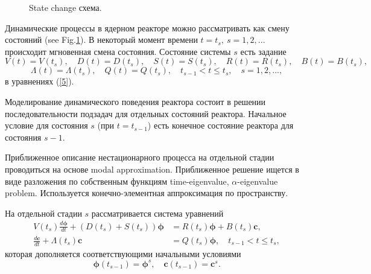\documentclass[authoryear]{elsarticle}
\begin{document}
\begin{figure}[ht] 
  \begin{center}
\vspace{5mm} 
    \caption{State change схема.} 
   \label{fig:1}
  \end{center}
\end{figure}

Динамические процессы в ядерном реакторе можно рассматривать как смену состояний (see  Fig.\ref{fig:1}). 
В некоторый момент времени $t = t_s, \ s = 1,2, ...$ происходит мгновенная смена состояния.
Состояние системы $s$ есть задание
\[
 V(t) = V(t_s), \quad  D(t) = D(t_s), \quad  S(t) = S(t_s), \quad  R(t) = R(t_s), \quad  B(t) = B(t_s),
\] 
\[
 \Lambda(t) = \Lambda(t_s), \quad  Q(t) = Q(t_s),
 \quad t_{s-1} < t \leq t_s, \quad s = 1,2, ... ,
\] 
в уравнениях (\ref{5}).

Моделирование динамического поведения реактора состоит в решении последовательности
подзадач для отдельных состояний реактора. Начальное условие для состояния $s$ (при $t = t_{s-1}$) есть
конечное состояние реактора для состояния $s-1$.

Приближенное описание нестационарного процесса на отдельной стадии проводиться на основе modal approximation.
Приближенное решение ищется в виде разложения по собственным функциям time-eigenvalue, $\alpha$-eigenvalue problem. 
Используется конечно-элементная аппроксимация по пространству.

На отдельной стадии $s$ рассматривается система уравнений
\begin{equation}\label{7}
\begin{split}
V(t_s) \frac{d \bm \phi}{d t} + (D(t_s)+S(t_s)) \bm \phi &= R(t_s) \bm \phi + B(t_s)\bm c,
\\
\frac{d \bm c}{d t} + \Lambda(t_s)\bm c &= Q(t_s) \bm \phi, 
\quad t_{s-1} < t \leq t_s,
\end{split}
\end{equation} 
которая дополняется соответствующими начальными условиями 
\begin{equation}\label{8}
 \bm \phi(t_{s-1}) = \bm \phi^s,
 \quad   \bm c(t_{s-1}) = \bm c^s .
\end{equation} 
\end{document}
